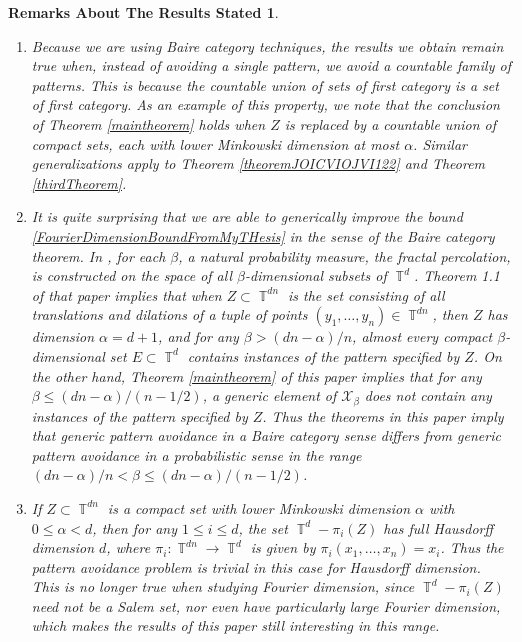 \documentclass[dvipsnames,letterpaper,12pt]{article}
\numberwithin{equation}{section}
\DeclareMathOperator{\TT}{\mathbb{T}}
\newtheorem*{remarksaboutresults}{Remarks About The Results Stated}
\numberwithin{theorem}{section}
\begin{document}
\begin{remarksaboutresults}
    \ 
    \begin{enumerate}
        \item Because we are using Baire category techniques, the results we obtain remain true when, instead of avoiding a single pattern, we avoid a countable family of patterns. This is because the countable union of sets of first category is a set of first category. As an example of this property, we note that the conclusion of Theorem \ref{maintheorem} holds when $Z$ is replaced by a \emph{countable union} of compact sets, each with lower Minkowski dimension at most $\alpha$. Similar generalizations apply to Theorem \ref{theoremJOICVIOJVI122} and Theorem \ref{thirdTheorem}.

        \item It is quite surprising that we are able to generically improve the bound \eqref{FourierDimensionBoundFromMyTHesis} in the sense of the Baire category theorem. In \cite{Schmerkin2}, for each $\beta$, a natural probability measure, the \emph{fractal percolation}, is constructed on the space of all $\beta$-dimensional subsets of $\TT^d$. Theorem 1.1 of that paper implies that when $Z \subset \TT^{dn}$ is the set consisting of all translations and dilations of a tuple of points $(y_1,\dots,y_n) \in \TT^{dn}$, then $Z$ has dimension $\alpha = d+1$, and for any $\beta > (dn - \alpha)/n$, almost every compact $\beta$-dimensional set $E \subset \TT^d$ \emph{contains} instances of the pattern specified by $Z$. On the other hand, Theorem \ref{maintheorem} of this paper implies that for any $\beta \leq (dn - \alpha)/(n-1/2)$, a generic element of $\mathcal{X}_\beta$ does not contain any instances of the pattern specified by $Z$. Thus the theorems in this paper imply that generic pattern avoidance in a Baire category sense differs from generic pattern avoidance in a probabilistic sense in the range $(dn - \alpha)/n < \beta \leq (dn - \alpha)/(n - 1/2)$.

        \item If $Z \subset \TT^{dn}$ is a compact set with lower Minkowski dimension $\alpha$ with $0 \leq \alpha < d$, then for any $1 \leq i \leq d$, the set $\TT^d - \pi_i(Z)$ has full Hausdorff dimension $d$, where $\pi_i: \TT^{dn} \to \TT^d$ is given by $\pi_i(x_1,\dots,x_n) = x_i$. Thus the pattern avoidance problem is trivial in this case for Hausdorff dimension. This is no longer true when studying Fourier dimension, since $\TT^d - \pi_i(Z)$ need not be a Salem set, nor even have particularly large Fourier dimension, which makes the results of this paper still interesting in this range.


\end{enumerate}
\end{remarksaboutresults}
\end{document}
